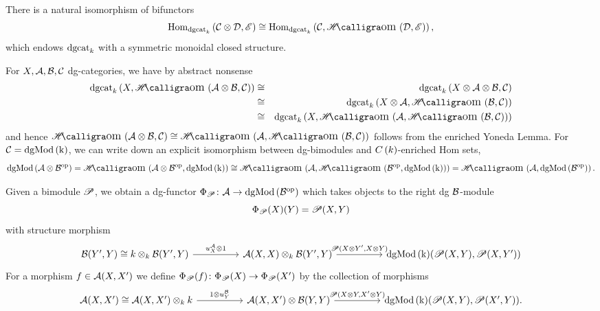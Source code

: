 \documentclass[dissertation.tex]{subfiles}
\begin{document}
\begin{rmk}
  There is a natural isomorphism of bifunctors
  $$\Hom{\op{dgcat}_k}{\C \otimes \D, \mathscr{E}} \cong \Hom{\op{dgcat}_k}{\C, \SHom{\D,\mathscr{E}}},$$
  which endows $\operatorname{dgcat}_k$ with a symmetric monoidal closed structure.

  For $X,\mathcal{A}, \mathcal{B}, \mathcal{C}$ dg-categories, we have by abstract nonsense
  \begin{eqnarray*}
    \dgcat{k}\left(X, \SHom{\A \otimes \B, \C}\right) &\cong& \dgcat{k}\left(X \otimes \A \otimes \B, \C\right)\\
    &\cong& \dgcat{k}\left(X \otimes \A, \SHom{\B, \C}\right)\\
    &\cong& \dgcat{k}\left(X, \SHom{\A,\SHom{\B, \C}}\right)
  \end{eqnarray*}
  and hence $\SHom{\A \otimes \B, \C} \cong \SHom{\A, \SHom{\B, \C}}$ follows from the enriched Yoneda Lemma.
  For $\mathcal{C} = \operatorname{dgMod\left(k\right)}$, we can write down an explicit isomorphism between dg-bimodules and $C\left(k\right)$-enriched Hom sets,
  $$\cdg{\A \otimes \B^\text{op}} = \SHom{\A \otimes \B^\text{op}, \cdg{k}} \cong \SHom{\A, \SHom{\B^\opp, \cdg{k}}} = \SHom{\A,\cdg{\B^\opp}}.$$
  
  Given a bimodule $\mathscr{P}$, we obtain a dg-functor $\Phi_{\mathscr{P}} \colon \mathcal{A} \to \operatorname{dgMod\left(\mathcal{B}^\text{op}\right)}$ which takes objects to the right dg $\mathcal{B}$-module 
  $$\Phi_{\mathscr{P}}(X)(Y) = \mathscr{P}(X,Y)$$
  with structure morphism
  $$\begin{tikzcd}
    \B(Y^\prime, Y) \cong k \otimes_k \B(Y^\prime, Y) \arrow{rr}{u^\A_X \otimes 1} && 
    \A(X,X) \otimes_k \B(Y^\prime, Y) \arrow{rr}{\funct{P}(X \otimes Y^\prime, X \otimes Y)} &&
    \cdg{k}(\funct{P}(X,Y), \funct{P}(X,Y^\prime))
  \end{tikzcd}$$
  For a morphism $f \in \mathcal{A}(X,X^\prime)$ we define $\Phi_{\mathscr{P}}(f) \colon \Phi_{\mathscr{P}}(X) \to \Phi_{\mathscr{P}}(X^\prime)$ by the collection of morphisms
  $$\begin{tikzcd}
    \A(X,X^\prime) \cong \A(X,X^\prime) \otimes_k k \arrow{rr}{1 \otimes u^\B_Y} && \A(X,X^\prime) \otimes \B(Y,Y) \arrow{rr}{\funct{P}(X \otimes Y, X^\prime \otimes Y)} && \cdg{k}(\funct{P}(X,Y), \funct{P}(X^\prime, Y)).
  \end{tikzcd}$$


\end{rmk}
\end{document}
